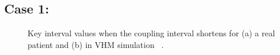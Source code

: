 
 \subsection{Case 1: }
\begin{figure}[!t]
\centering
\label{fig:Case_1}
\caption{\small Key interval values when the coupling interval shortens for (a) a real patient and (b) in VHM simulation ~\cite{vhm_ecrts10}.}
\end{figure} 


